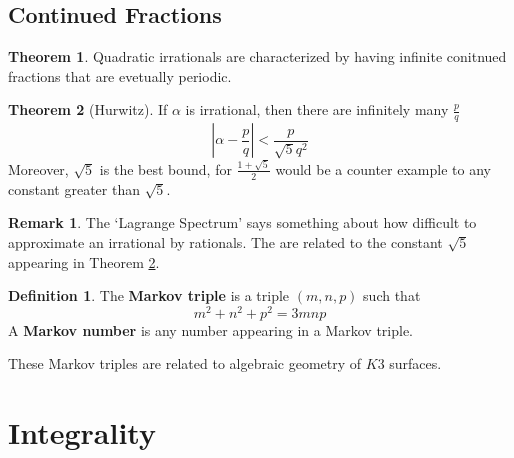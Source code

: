 \documentclass{article}
\theoremstyle{definition}
\newtheorem{theorem}{Theorem}[section]
\theoremstyle{definition}
\newtheorem{definition}{Definition}[theorem]
\theoremstyle{definition}
\newtheorem{remark}{Remark}[theorem]
\theoremstyle{definition}
\theoremstyle{definition}
\theoremstyle{definition}
\theoremstyle{definition}
\begin{document}
\subsection{Continued Fractions}


\begin{tcolorbox}[colback=red!5!white,colframe=red!30!white]
\begin{theorem}
    Quadratic irrationals are characterized by having infinite conitnued fractions that are evetually periodic. 
\end{theorem}
\end{tcolorbox}



\begin{tcolorbox}[colback=red!5!white,colframe=red!30!white]
\begin{theorem}[Hurwitz]
    \label{Hurwitz}
    If $\alpha $ is irrational, then there are infinitely many $\frac{p}{q}$
    \[|\alpha-\frac{p}{q}|<\frac{p}{\sqrt{5}q^2}\]
    Moreover, $\sqrt{5}$ is the best bound, for $\frac{1+\sqrt{5}}{2}$ would be a counter example to any constant greater than $\sqrt{5}$.
\end{theorem}
\end{tcolorbox}


\begin{tcolorbox}[colback=green!5!white,colframe=green!30!white]
\begin{remark}
The `Lagrange Spectrum' says something about how difficult to approximate an irrational by rationals. The are related to the constant $\sqrt{5}$ appearing in Theorem \ref{Hurwitz}.
\end{remark}
\end{tcolorbox}













\begin{tcolorbox}[colback=purple!5!white,colframe=purple!75!black]
\begin{definition}
The \textbf{Markov triple} is a triple $(m,n,p)$
such that 
\[m^2+n^2+p^2=3mnp\]
A \textbf{Markov number} is any number appearing in a Markov triple. 
\end{definition}
\end{tcolorbox}
These Markov triples are related to algebraic geometry of $K3$ surfaces.  


\section{Integrality}
\end{document}
